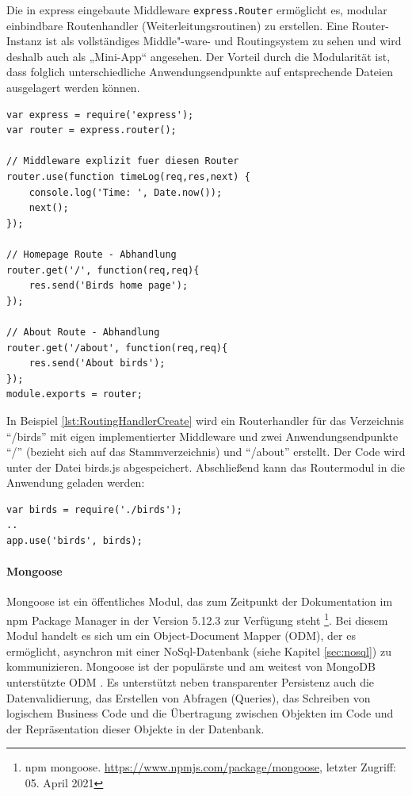 \noindent
Die in express eingebaute Middleware \texttt{express.Router} ermöglicht es, modular einbindbare Routenhandler (Weiterleitungsroutinen) zu erstellen. Eine Router-Instanz ist als vollständiges Middle"-ware- und Routingsystem zu sehen und wird deshalb auch als „Mini-App“ angesehen. Der Vorteil durch die Modularität ist, dass folglich unterschiedliche Anwendungsendpunkte auf entsprechende Dateien ausgelagert werden können.
\newline

\begin{lstlisting}[caption=Routinghandler erstellen \protect \footnotemark,label=lst:RoutingHandlerCreate]
var express = require('express');
var router = express.router();

// Middleware explizit fuer diesen Router
router.use(function timeLog(req,res,next) {
	console.log('Time: ', Date.now());
	next();
});

// Homepage Route - Abhandlung
router.get('/', function(req,req){
	res.send('Birds home page');
});

// About Route - Abhandlung
router.get('/about', function(req,req){
	res.send('About birds');
});
module.exports = router;
\end{lstlisting}

\noindent
In Beispiel \ref{lst:RoutingHandlerCreate} wird ein Routerhandler für das Verzeichnis \enquote{/birds} mit eigen implementierter Middleware und zwei Anwendungsendpunkte \enquote{/} (bezieht sich auf das Stammverzeichnis) und \enquote{/about} erstellt. Der Code wird unter der Datei birds.js abgespeichert. 
Abschließend kann das Routermodul in die Anwendung geladen werden: 
\newline

\begin{lstlisting}[caption=Routinghandler benutzen,label=lst:RoutingHandlerUsage]
var birds = require('./birds');
..
app.use('birds', birds);
\end{lstlisting}

%
%
%

\newpage
\paragraph{Mongoose}
Mongoose ist ein öffentliches Modul, das zum Zeitpunkt der Dokumentation im npm Package Manager in der Version 5.12.3 zur Verfügung steht \footnote{npm mongoose. \url{https://www.npmjs.com/package/mongoose}, letzter Zugriff: 05. April 2021}. Bei diesem Modul handelt es sich um ein Object-Document Mapper (ODM), der es ermöglicht, asynchron mit einer NoSql-Datenbank (siehe Kapitel \ref{sec:nosql}) zu kommunizieren. Mongoose ist der populärste und am weitest von MongoDB unterstützte ODM \cite{Node2.55}. Es unterstützt neben transparenter Persistenz auch die Datenvalidierung, das Erstellen von Abfragen (Queries), das Schreiben von logischem Business Code und die Übertragung zwischen Objekten im Code und der Repräsentation dieser Objekte in der Datenbank.
\newline

